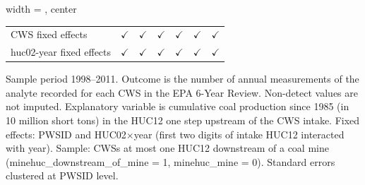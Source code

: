 \begin{table}[htbp]
\begin{adjustbox}{width = \textwidth, center}
\begin{tabular}{lcccccc}
          \\
         
         CWS fixed effects                   & $\checkmark$      & $\checkmark$       & $\checkmark$      & $\checkmark$            & $\checkmark$            & $\checkmark$\\   
         huc02-year fixed effects            & $\checkmark$      & $\checkmark$       & $\checkmark$      & $\checkmark$            & $\checkmark$            & $\checkmark$\\   
         
         \bottomrule
         
      \end{tabular}
      
      
      
   \end{adjustbox}
      {\tiny\linespread{1}\selectfont \par \raggedright 
   Sample period 1998--2011. Outcome is the number of annual measurements of the analyte recorded for each CWS in the EPA 6-Year Review. Non-detect values are not imputed. Explanatory variable is cumulative coal production since 1985 (in 10 million short tons) in the HUC12 one step upstream of the CWS intake. Fixed effects: PWSID and HUC02$\times$year (first two digits of intake HUC12 interacted with year). Sample: CWSs at most one HUC12 downstream of a coal mine (minehuc\_downstream\_of\_mine = 1, minehuc\_mine = 0). Standard errors clustered at PWSID level.}
   
\end{table}


